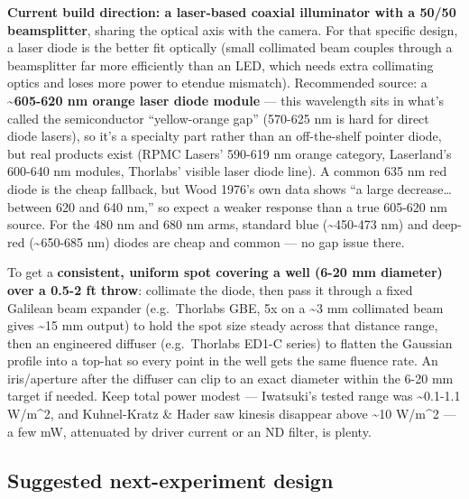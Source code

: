 \documentclass[
]{article}
\begin{document}
\textbf{Current build direction: a laser-based coaxial illuminator with
a 50/50 beamsplitter}, sharing the optical axis with the camera. For
that specific design, a laser diode is the better fit optically (small
collimated beam couples through a beamsplitter far more efficiently than
an LED, which needs extra collimating optics and loses more power to
etendue mismatch). Recommended source: a \textbf{\textasciitilde605-620
nm orange laser diode module} --- this wavelength sits in what's called
the semiconductor ``yellow-orange gap'' (570-625 nm is hard for direct
diode lasers), so it's a specialty part rather than an off-the-shelf
pointer diode, but real products exist (RPMC Lasers' 590-619 nm orange
category, Laserland's 600-640 nm modules, Thorlabs' visible laser diode
line). A common 635 nm red diode is the cheap fallback, but Wood 1976's
own data shows ``a large decrease\ldots{} between 620 and 640 nm,'' so
expect a weaker response than a true 605-620 nm source. For the 480 nm
and 680 nm arms, standard blue (\textasciitilde450-473 nm) and deep-red
(\textasciitilde650-685 nm) diodes are cheap and common --- no gap issue
there.

To get a \textbf{consistent, uniform spot covering a well (6-20 mm
diameter) over a 0.5-2 ft throw}: collimate the diode, then pass it
through a fixed Galilean beam expander (e.g.~Thorlabs GBE, 5x on a
\textasciitilde3 mm collimated beam gives \textasciitilde15 mm output)
to hold the spot size steady across that distance range, then an
engineered diffuser (e.g.~Thorlabs ED1-C series) to flatten the Gaussian
profile into a top-hat so every point in the well gets the same fluence
rate. An iris/aperture after the diffuser can clip to an exact diameter
within the 6-20 mm target if needed. Keep total power modest ---
Iwatsuki's tested range was \textasciitilde0.1-1.1 W/m\^{}2, and
Kuhnel-Kratz \& Hader saw kinesis disappear above \textasciitilde10
W/m\^{}2 --- a few mW, attenuated by driver current or an ND filter, is
plenty.

\hypertarget{suggested-next-experiment-design}{%
\subsection{Suggested next-experiment
design}\label{suggested-next-experiment-design}}
\end{document}
